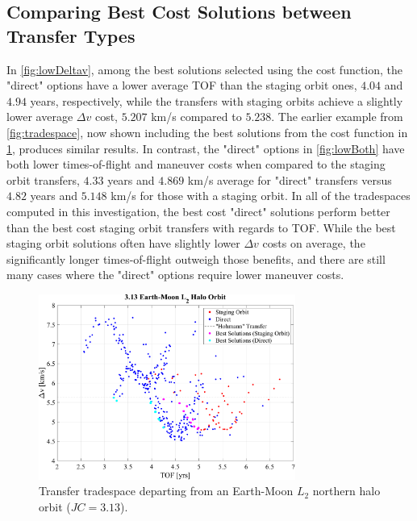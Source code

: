 \subsection{Comparing Best Cost Solutions between Transfer Types}
In \cref{fig:lowDeltav}, among the best solutions selected using the cost function, the "direct"
options have a lower average TOF than the staging orbit ones, $4.04$ and $4.94$ years,
respectively, while the transfers with staging orbits achieve a slightly lower average $\Delta v$
cost, $5.207$ km/s compared to $5.238$. The earlier example from \cref{fig:tradespace}, now shown
including the best solutions from the cost function in \cref{fig:costTradespace}, produces similar
results. In contrast, the "direct" options in \cref{fig:lowBoth} have both lower times-of-flight
and maneuver costs when compared to the staging orbit transfers, $4.33$ years and $4.869$ km/s
average for "direct" transfers versus $4.82$ years and $5.148$ km/s for those with a staging orbit.
In all of the tradespaces computed in this investigation, the best cost "direct" solutions perform
better than the best cost staging orbit transfers with regards to TOF. While the best staging orbit
solutions often have slightly lower $\Delta v$ costs on average, the significantly longer
times-of-flight outweigh those benefits, and there are still many cases where the "direct" options
require lower maneuver costs.

\begin{figure}[ht]
    \centering
    \includegraphics[width=0.75\textwidth]{figures/TradeSpace_L2Halo_3_13.pdf}
    \caption{Transfer tradespace departing from an Earth-Moon $L_{2}$ northern halo orbit ($JC=3.13$).}
    \label{fig:costTradespace}
\end{figure}

